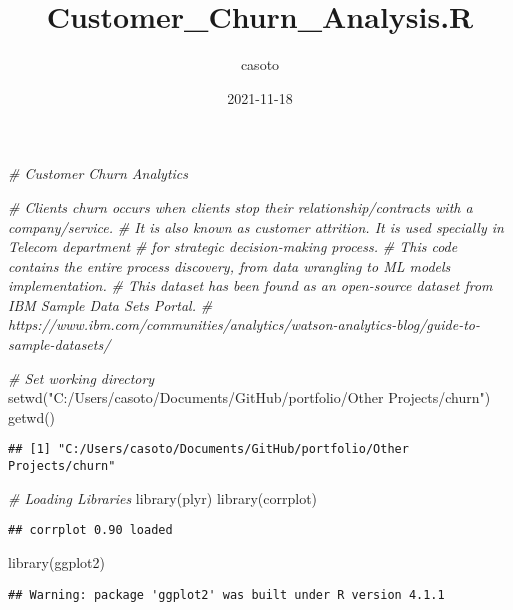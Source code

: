\documentclass[
]{article}
\title{Customer\_Churn\_Analysis.R}
\author{casoto}
\date{2021-11-18}
\newenvironment{Shaded}{\begin{snugshade}}{\end{snugshade}}
\newcommand{\CommentTok}[1]{\textcolor[rgb]{0.56,0.35,0.01}{\textit{#1}}}
\newcommand{\FunctionTok}[1]{\textcolor[rgb]{0.00,0.00,0.00}{#1}}
\newcommand{\NormalTok}[1]{#1}
\newcommand{\StringTok}[1]{\textcolor[rgb]{0.31,0.60,0.02}{#1}}
\begin{document}
\maketitle

\begin{Shaded}
\begin{Highlighting}[]
\CommentTok{\# Customer Churn Analytics }

\CommentTok{\# Clients churn occurs when clients stop their relationship/contracts with a company/service.}
\CommentTok{\# It is also known as \textquotesingle{}customer attrition\textquotesingle{}. It is used specially in Telecom department }
\CommentTok{\# for strategic decision{-}making process. }
\CommentTok{\# This code contains the entire process discovery, from data wrangling to ML models implementation.}
\CommentTok{\# This dataset has been found as an open{-}source dataset from IBM Sample Data Sets Portal.}
\CommentTok{\# https://www.ibm.com/communities/analytics/watson{-}analytics{-}blog/guide{-}to{-}sample{-}datasets/}

\CommentTok{\# Set working directory}
\FunctionTok{setwd}\NormalTok{(}\StringTok{"C:/Users/casoto/Documents/GitHub/portfolio/Other Projects/churn"}\NormalTok{)}
\FunctionTok{getwd}\NormalTok{()}
\end{Highlighting}
\end{Shaded}

\begin{verbatim}
## [1] "C:/Users/casoto/Documents/GitHub/portfolio/Other Projects/churn"
\end{verbatim}

\begin{Shaded}
\begin{Highlighting}[]
\CommentTok{\# Loading Libraries}
\FunctionTok{library}\NormalTok{(plyr)}
\FunctionTok{library}\NormalTok{(corrplot)}
\end{Highlighting}
\end{Shaded}

\begin{verbatim}
## corrplot 0.90 loaded
\end{verbatim}

\begin{Shaded}
\begin{Highlighting}[]
\FunctionTok{library}\NormalTok{(ggplot2)}
\end{Highlighting}
\end{Shaded}

\begin{verbatim}
## Warning: package 'ggplot2' was built under R version 4.1.1
\end{verbatim}
\end{document}
